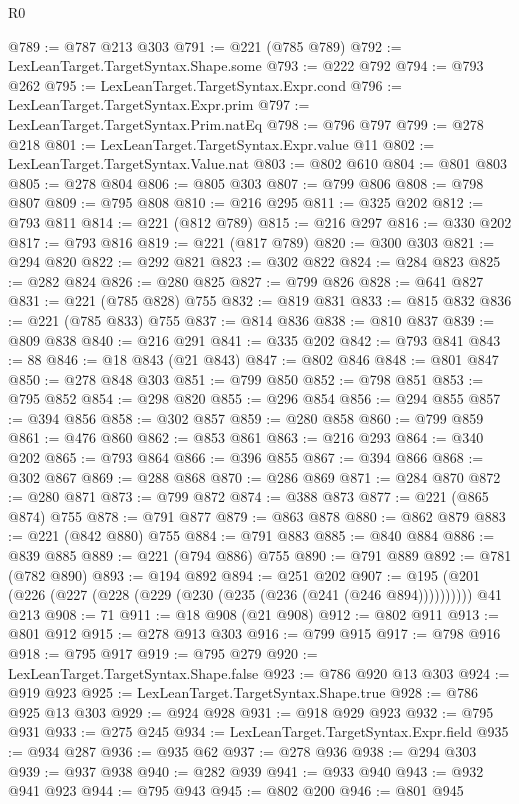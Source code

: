 \begin{lexlean}{R0}
\begin{coremodule}
@789 := @787 @213 @303
@791 := @221 (@785 @789)
@792 := LexLeanTarget.TargetSyntax.Shape.some
@793 := @222 @792
@794 := @793 @262
@795 := LexLeanTarget.TargetSyntax.Expr.cond
@796 := LexLeanTarget.TargetSyntax.Expr.prim
@797 := LexLeanTarget.TargetSyntax.Prim.natEq
@798 := @796 @797
@799 := @278 @218
@801 := LexLeanTarget.TargetSyntax.Expr.value @11
@802 := LexLeanTarget.TargetSyntax.Value.nat
@803 := @802 @610
@804 := @801 @803
@805 := @278 @804
@806 := @805 @303
@807 := @799 @806
@808 := @798 @807
@809 := @795 @808
@810 := @216 @295
@811 := @325 @202
@812 := @793 @811
@814 := @221 (@812 @789)
@815 := @216 @297
@816 := @330 @202
@817 := @793 @816
@819 := @221 (@817 @789)
@820 := @300 @303
@821 := @294 @820
@822 := @292 @821
@823 := @302 @822
@824 := @284 @823
@825 := @282 @824
@826 := @280 @825
@827 := @799 @826
@828 := @641 @827
@831 := @221 (@785 @828) @755
@832 := @819 @831
@833 := @815 @832
@836 := @221 (@785 @833) @755
@837 := @814 @836
@838 := @810 @837
@839 := @809 @838
@840 := @216 @291
@841 := @335 @202
@842 := @793 @841
@843 := 88
@846 := @18 @843 (@21 @843)
@847 := @802 @846
@848 := @801 @847
@850 := @278 @848 @303
@851 := @799 @850
@852 := @798 @851
@853 := @795 @852
@854 := @298 @820
@855 := @296 @854
@856 := @294 @855
@857 := @394 @856
@858 := @302 @857
@859 := @280 @858
@860 := @799 @859
@861 := @476 @860
@862 := @853 @861
@863 := @216 @293
@864 := @340 @202
@865 := @793 @864
@866 := @396 @855
@867 := @394 @866
@868 := @302 @867
@869 := @288 @868
@870 := @286 @869
@871 := @284 @870
@872 := @280 @871
@873 := @799 @872
@874 := @388 @873
@877 := @221 (@865 @874) @755
@878 := @791 @877
@879 := @863 @878
@880 := @862 @879
@883 := @221 (@842 @880) @755
@884 := @791 @883
@885 := @840 @884
@886 := @839 @885
@889 := @221 (@794 @886) @755
@890 := @791 @889
@892 := @781 (@782 @890)
@893 := @194 @892
@894 := @251 @202
@907 := @195 (@201 (@226 (@227 (@228 (@229 (@230 (@235 (@236 (@241 (@246 @894)))))))))) @41 @213
@908 := 71
@911 := @18 @908 (@21 @908)
@912 := @802 @911
@913 := @801 @912
@915 := @278 @913 @303
@916 := @799 @915
@917 := @798 @916
@918 := @795 @917
@919 := @795 @279
@920 := LexLeanTarget.TargetSyntax.Shape.false
@923 := @786 @920 @13 @303
@924 := @919 @923
@925 := LexLeanTarget.TargetSyntax.Shape.true
@928 := @786 @925 @13 @303
@929 := @924 @928
@931 := @918 @929 @923
@932 := @795 @931
@933 := @275 @245
@934 := LexLeanTarget.TargetSyntax.Expr.field
@935 := @934 @287
@936 := @935 @62
@937 := @278 @936
@938 := @294 @303
@939 := @937 @938
@940 := @282 @939
@941 := @933 @940
@943 := @932 @941 @923
@944 := @795 @943
@945 := @802 @200
@946 := @801 @945

\end{coremodule}
\end{lexlean}
